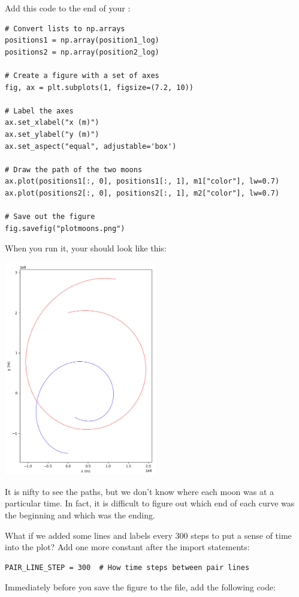 Add this code to the end of your :

\begin{verbatim}
# Convert lists to np.arrays
positions1 = np.array(position1_log)
positions2 = np.array(position2_log)

# Create a figure with a set of axes
fig, ax = plt.subplots(1, figsize=(7.2, 10))

# Label the axes
ax.set_xlabel("x (m)")
ax.set_ylabel("y (m)")
ax.set_aspect("equal", adjustable='box')

# Draw the path of the two moons
ax.plot(positions1[:, 0], positions1[:, 1], m1["color"], lw=0.7)
ax.plot(positions2[:, 0], positions2[:, 1], m2["color"], lw=0.7)

# Save out the figure
fig.savefig("plotmoons.png")
\end{verbatim}

When you run it,   your  should look like this:

\includegraphics[width=0.5\textwidth]{plotmoons_01.png}

It is nifty to see the paths,  but we don't know where each moon was at a particular time.  In fact, it is difficult to figure out which end of each curve was the beginning and which was the ending.

What if we added some lines and labels every 300 steps to put a sense of time into the plot?  Add one more  constant after the import statements:
\begin{verbatim}
PAIR_LINE_STEP = 300  # How time steps between pair lines
\end{verbatim}


Immediately before you
save the figure to the file,  add the following code:

